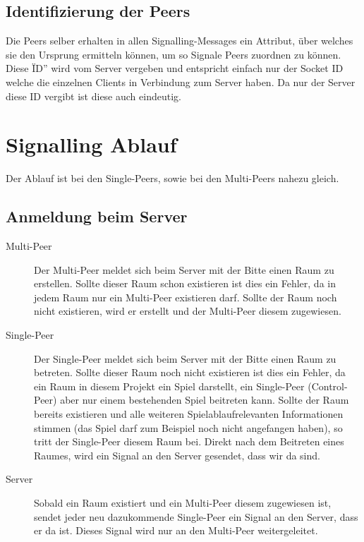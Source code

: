 \subsection{Identifizierung der Peers}
Die Peers selber erhalten in allen Signalling-Messages ein Attribut, über 
welches sie den Ursprung ermitteln können, um so Signale Peers zuordnen zu 
können. Diese \"ID'' wird vom Server vergeben und entspricht einfach nur der 
Socket ID welche die einzelnen Clients in Verbindung zum Server haben.
Da nur der Server diese ID vergibt ist diese auch eindeutig.



\section{Signalling Ablauf}
Der Ablauf ist bei den Single-Peers, sowie bei den Multi-Peers nahezu gleich.



\subsection{Anmeldung beim Server}
\begin{description}
\item[Multi-Peer]
Der Multi-Peer meldet sich beim Server mit der Bitte einen Raum zu erstellen. 
Sollte dieser Raum schon existieren ist dies ein Fehler, da in jedem Raum nur 
ein Multi-Peer existieren darf. Sollte der Raum noch nicht existieren, wird er 
erstellt und der Multi-Peer diesem zugewiesen.

\item[Single-Peer]
Der Single-Peer meldet sich beim Server mit der Bitte einen Raum zu betreten. 
Sollte dieser Raum noch nicht existieren ist dies ein Fehler, da ein Raum in 
diesem Projekt ein Spiel darstellt, ein Single-Peer (Control-Peer) aber nur 
einem bestehenden Spiel beitreten kann. Sollte der Raum bereits existieren und 
alle weiteren Spielablaufrelevanten Informationen stimmen (das Spiel darf zum 
Beispiel noch nicht angefangen haben), so tritt der Single-Peer diesem Raum bei. 
Direkt nach dem Beitreten eines Raumes, wird ein Signal an den Server gesendet, 
dass wir da sind.

\item[Server]
Sobald ein Raum existiert und ein Multi-Peer diesem zugewiesen ist, sendet jeder 
neu dazukommende Single-Peer ein Signal an den Server, dass er da ist. Dieses 
Signal wird nur an den Multi-Peer weitergeleitet.
\end{description}



